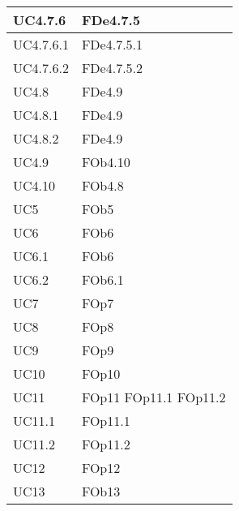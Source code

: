 \begin{longtable}{|l|p{4cm}|}
\hline
		UC4.7.6 & FDe4.7.5 \linebreak   \\
\hline
		UC4.7.6.1 & FDe4.7.5.1 \linebreak   \\
\hline
		UC4.7.6.2 & FDe4.7.5.2 \linebreak   \\
\hline
		UC4.8 & FDe4.9 \linebreak   \\
\hline
		UC4.8.1 & FDe4.9 \linebreak   \\
\hline
		UC4.8.2 & FDe4.9 \linebreak   \\
\hline
		UC4.9 & FOb4.10 \linebreak   \\
\hline
		UC4.10 & FOb4.8 \linebreak   \\
\hline
		UC5 & FOb5 \linebreak   \\
\hline
		UC6 & FOb6 \linebreak   \\
\hline
		UC6.1 & FOb6 \linebreak   \\
\hline
		UC6.2 & FOb6.1 \linebreak   \\
\hline
		UC7 & FOp7 \linebreak   \\
\hline
		UC8 & FOp8 \linebreak   \\
\hline
		UC9 & FOp9 \linebreak   \\
\hline
		UC10 & FOp10 \linebreak   \\
\hline
		UC11 & FOp11 \linebreak  FOp11.1 \linebreak  FOp11.2 \linebreak   \\
\hline
		UC11.1 & FOp11.1 \linebreak   \\
\hline
		UC11.2 & FOp11.2 \linebreak   \\
\hline
		UC12 & FOp12 \linebreak   \\
\hline
		UC13 & FOb13 \linebreak   \\

\end{longtable}
